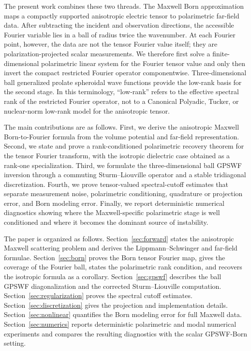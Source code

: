 \documentclass[11pt]{article}
\numberwithin{equation}{section}
\theoremstyle{plain}
\theoremstyle{definition}
\begin{document}
The present work combines these two threads.  The Maxwell Born approximation maps a compactly supported anisotropic electric tensor to polarimetric far-field data.  After subtracting the incident and observation directions, the accessible Fourier variable lies in a ball of radius twice the wavenumber.  At each Fourier point, however, the data are not the tensor Fourier value itself; they are polarization-projected scalar measurements.  We therefore first solve a finite-dimensional polarimetric linear system for the Fourier tensor value and only then invert the compact restricted Fourier operator componentwise.  Three-dimensional ball generalized prolate spheroidal wave functions provide the low-rank basis for the second stage.  In this terminology, ``low-rank'' refers to the effective spectral rank of the restricted Fourier operator, not to a Canonical Polyadic, Tucker, or nuclear-norm low-rank model for the anisotropic tensor.

The main contributions are as follows.  First, we derive the anisotropic Maxwell Born-to-Fourier formula from the volume potential and far-field representation.  Second, we state and prove a rank-conditioned polarimetric recovery theorem for the tensor Fourier transform, with the isotropic dielectric case obtained as a rank-one specialization.  Third, we formulate the three-dimensional ball GPSWF inversion through a commuting Sturm--Liouville operator and a stable tridiagonal discretization.  Fourth, we prove tensor-valued spectral-cutoff estimates that separate measurement noise, polarimetric conditioning, quadrature or projection error, and Born modeling error.  Finally, we report deterministic numerical diagnostics showing where the Maxwell-specific polarimetric stage is well conditioned and where it becomes the dominant source of instability.

The paper is organized as follows.  Section~\ref{sec:forward} states the anisotropic Maxwell scattering problem and derives the Lippmann--Schwinger and far-field formulae.  Section~\ref{sec:born} proves the Born tensor Fourier map, gives the coverage of the Fourier ball, states the polarimetric rank condition, and recovers the isotropic formula as a corollary.  Section~\ref{sec:gpswf} describes the ball GPSWF diagonalization and the corrected Sturm--Liouville computation.  Section~\ref{sec:regularization} proves the spectral cutoff estimates.  Section~\ref{sec:discretization} gives the projection and implementation details.  Section~\ref{sec:nonlinear} quantifies the Born modeling error for full Maxwell data.  Section~\ref{sec:numerics} reports deterministic polarimetric and modal numerical experiments and compares the resulting diagnostics with the scalar GPSWF-Born setting.
\end{document}

